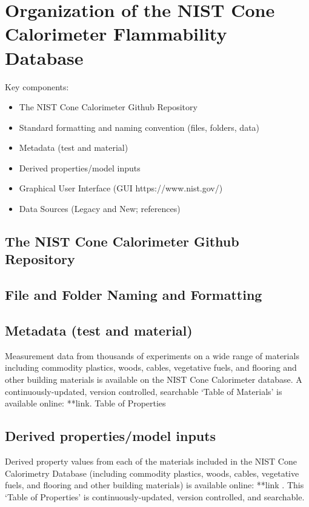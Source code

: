 \section{Organization of the NIST Cone Calorimeter Flammability Database} \label{sec:DB-overview}
Key components:
\begin{itemize}
\item The NIST Cone Calorimeter Github Repository
\item Standard formatting and naming convention (files, folders, data)
\item Metadata (test and material)
\item Derived properties/model inputs
\item Graphical User Interface (GUI https://www.nist.gov/)
\item Data Sources (Legacy and New; references)
\end{itemize}

\subsection{The NIST Cone Calorimeter Github Repository} \label{ssec:DB-Github}

\subsection{File and Folder Naming and Formatting} \label{ssec:DB-formatting}

\subsection{Metadata (test and material)} \label{ssec:DB-metadata}
Measurement data from thousands of experiments on a wide range of materials including commodity plastics, woods, cables, vegetative fuels, and flooring and other building materials is available on the NIST Cone Calorimeter database. A continuously-updated, version controlled, searchable `Table of Materials' is available online: **link.
Table of Properties
\subsection{Derived properties/model inputs} \label{ssec:DB-properties}
Derived property values from each of the materials included in the NIST Cone Calorimetry Database (including commodity plastics, woods, cables, vegetative fuels, and flooring and other building materials) is available online: **link . This `Table of Properties' is continuously-updated, version controlled, and searchable.

